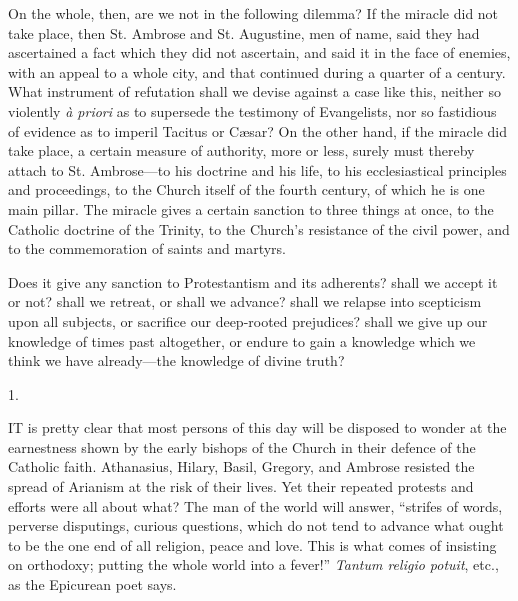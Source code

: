 On the whole, then, are we not in the following dilemma? If the
miracle did not take place, then St. Ambrose and St. Augustine, men of
name, said they had ascertained a fact which they did not ascertain,
and said it in the face of enemies, with an appeal to a whole city,
and that continued during a quarter of a century. What instrument of
refutation shall we devise against a case like this, neither so
violently \emph{à priori} as to supersede the testimony of
Evangelists, nor so fastidious of evidence as to imperil Tacitus or
Cæsar? On the other hand, if the miracle did take place, a certain
measure of authority, more or less, surely must thereby attach to St.
Ambrose—to his doctrine and his life, to his ecclesiastical
principles and proceedings, to the Church itself of the fourth
century, of which he is one main pillar. The miracle gives a certain
sanction to three things at once, to the Catholic doctrine of the
Trinity, to the Church's resistance of the civil power, and to the
commemoration of saints and martyrs.

Does it give any sanction to Protestantism and its adherents? shall
we accept it or not? shall we retreat, or shall we advance? shall we
relapse into scepticism upon all subjects, or sacrifice our
deep-rooted prejudices? shall we give up our knowledge of times past
altogether, or endure to gain a knowledge which we think we have
already—the knowledge of divine truth?


1.

IT is pretty clear that most persons of
this day will be disposed to wonder at the earnestness shown by the
early bishops of the Church in their defence of the Catholic faith.
Athanasius, Hilary, Basil, Gregory, and Ambrose resisted the spread of
Arianism at the risk of their lives. Yet their repeated protests and
efforts were all about what? The man of the world will answer, ``strifes
of words, perverse disputings, curious questions, which do not tend to
advance what ought to be the one end of all religion, peace and love.
This is what comes of insisting on orthodoxy; putting the whole world
into a fever!'' \emph{Tantum religio potuit}, etc., as the
Epicurean poet says.

